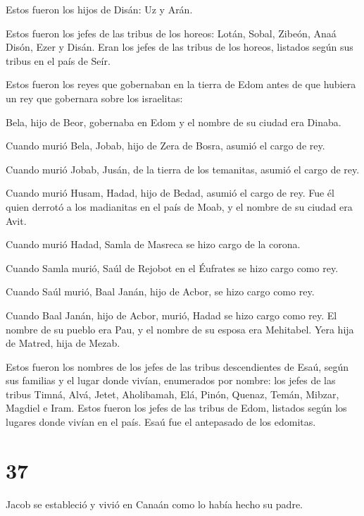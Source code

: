  Estos fueron los hijos de Disán: Uz y Arán.

 Estos fueron los jefes de las tribus de los horeos: Lotán,
Sobal, Zibeón, Anaá  Disón, Ezer y Disán. Eran los jefes de
las tribus de los horeos, listados según sus tribus en el país de Seír.

 Estos fueron los reyes que gobernaban en la tierra de Edom
antes de que hubiera un rey que gobernara sobre los israelitas:

 Bela, hijo de Beor, gobernaba en Edom y el nombre de su
ciudad era Dinaba.

 Cuando murió Bela, Jobab, hijo de Zera de Bosra, asumió el
cargo de rey.

 Cuando murió Jobab, Jusán, de la tierra de los temanitas,
asumió el cargo de rey.

 Cuando murió Husam, Hadad, hijo de Bedad, asumió el cargo
de rey. Fue él quien derrotó a los madianitas en el país de Moab, y el
nombre de su ciudad era Avit.

 Cuando murió Hadad, Samla de Masreca se hizo cargo de la
corona.

 Cuando Samla murió, Saúl de Rejobot en el Éufrates se hizo
cargo como rey.

 Cuando Saúl murió, Baal Janán, hijo de Acbor, se hizo
cargo como rey.

 Cuando Baal Janán, hijo de Acbor, murió, Hadad se hizo
cargo como rey. El nombre de su pueblo era Pau, y el nombre de su esposa
era Mehitabel. Yera hija de Matred, hija de Mezab.

 Estos fueron los nombres de los jefes de las tribus
descendientes de Esaú, según sus familias y el lugar donde vivían,
enumerados por nombre: los jefes de las tribus Timná, Alvá, Jetet,
 Aholibamah, Elá, Pinón,  Quenaz, Temán,
Mibzar,  Magdiel e Iram. Estos fueron los jefes de las
tribus de Edom, listados según los lugares donde vivían en el país. Esaú
fue el antepasado de los edomitas.

\hypertarget{section-36}{%
\section{37}\label{section-36}}

 Jacob se estableció y vivió en Canaán como lo había hecho
su padre.

